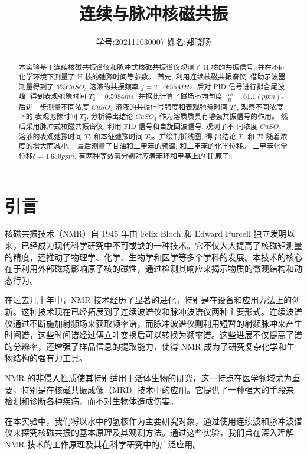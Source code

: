 \documentclass[12pt,a4paper]{article}
\title{\vspace{-4cm}\Large 连续与脉冲核磁共振}  %
\author{\kaishu 学号:202111030007 \hspace{2cm} 姓名:郑晓旸}   %
\date{}
\begin{document}
\maketitle

\begin{abstract}
    本实验基于连续核磁共振谱仪和脉冲式核磁共振谱仪观测了 H 核的共振信号, 并在不同化学环境下测量了 H 核的弛豫时间等参数。
    首先, 利用连续核磁共振谱仪, 借助示波器测量得到了 5\%$CuS O_4$ 溶液的共振频率 $f = 21.4655 MHz$, 后对 PID 信号进行拟合尾波峰, 得到表观弛豫时间
    $T_2^{\star} = 0.5984ms$, 并据此计算了磁场不均匀度 $\frac{\Delta B}{B}= 61.1(ppm)$。
    后进一步测量不同浓度 $CuS O_4$ 溶液的共振信号强度和表观弛豫时间 $T_2^{\star}$, 观察不同浓度下的
    表观弛豫时间 $T_2^{\star}$, 分析得出结论 $CuS O_4$ 作为溶质质具有增强共振信号的作用。
    然后采用脉冲式核磁共振谱仪, 利用 FID 信号和自旋回波信号, 观测了不
    同浓度 $CuS O_4$ 溶液的表观弛豫时间 $T_2^{\star}$ 和本征弛豫时间 $T_2$。并绘制折线图, 得
    出结论 $T_2$ 和 $T_2^{\star}$ 随着浓度的增大而减小。
    最后测量了甘油和二甲苯的频谱, 和二甲苯的化学位移。 二甲苯化学位移$\delta =4.659ppm$, 有两种等效氢分别对应着苯环和甲基上的 H 原子。
\end{abstract}

\section{引言}
核磁共振技术（NMR）自 1945 年由 Felix Bloch 和 Edward Purcell 独立发明以来，已经成为现代科学研究中不可或缺的一种技术。它不仅大大提高了核磁矩测量的精度，还推动了物理学、化学、生物学和医学等多个学科的发展。本技术的核心在于利用外部磁场影响原子核的磁性，通过检测其响应来揭示物质的微观结构和动态行为。

在过去几十年中，NMR 技术经历了显著的进化，特别是在设备和应用方法上的创新。这种技术现在已经拓展到了连续波谱仪和脉冲波谱仪两种主要形式。连续波谱仪通过不断施加射频场来获取频率谱，而脉冲波谱仪则利用短暂的射频脉冲来产生时间谱，这些时间谱经过傅立叶变换后可以转换为频率谱。这些进展不仅提高了谱的分辨率，还增强了样品信息的提取能力，使得 NMR 成为了研究复杂化学和生物结构的强有力工具。

NMR 的非侵入性质使其特别适用于活体生物的研究，这一特点在医学领域尤为重要，特别是在核磁共振成像（MRI）技术中的应用。它提供了一种强大的手段来检测和诊断各种疾病，而不对生物体造成伤害。

在本实验中，我们将以水中的氢核作为主要研究对象，通过使用连续波和脉冲波谱仪来探究核磁共振的基本原理及其观测方法。通过这些实验，我们旨在深入理解 NMR 技术的工作原理及其在科学研究中的广泛应用。
\end{document}
